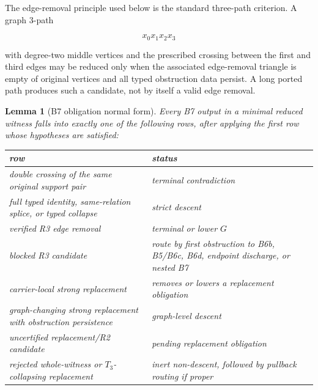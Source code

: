 \documentclass[11pt]{amsart}
\newtheorem{lemma}[theorem]{Lemma}
\theoremstyle{definition}
\begin{document}
The edge-removal principle used below is the standard three-path criterion. A graph \(3\)-path

\[
x_0x_1x_2x_3
\]

with degree-two middle vertices and the prescribed crossing between the first
and third edges may be reduced only when the associated edge-removal triangle
is empty of original vertices and all typed obstruction data persist. A long
ported path produces such a candidate, not by itself a valid edge removal.

\begin{lemma}[B7 obligation normal form]
Every B7 output in a minimal reduced witness falls into exactly one of the following rows, after applying the first row whose hypotheses are satisfied:

\begin{center}
\begin{tabular}{p{}p{}}
row & status \\ \hline
double crossing of the same original support pair & terminal contradiction \\
full typed identity, same-relation splice, or typed collapse & strict descent \\
verified R3 edge removal & terminal or lower \(G\) \\
blocked R3 candidate & route by first obstruction to B6b, B5/B6c, B6d, endpoint discharge, or nested B7 \\
carrier-local strong replacement & removes or lowers a replacement obligation \\
graph-changing strong replacement with obstruction persistence & graph-level descent \\
uncertified replacement/R2 candidate & pending replacement obligation \\
rejected whole-witness or \(T_3\)-collapsing replacement & inert non-descent, followed by pullback routing if proper \\
\end{tabular}
\end{center}

\end{lemma}
\end{document}
